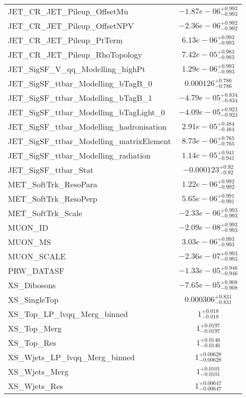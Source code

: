 \begin{tabular}{|l|c|}
JET\_CR\_JET\_Pileup\_OffsetMu & $-1.87e-06^{+0.993}_{-0.993}$ \\
JET\_CR\_JET\_Pileup\_OffsetNPV & $-2.36e-06^{+0.992}_{-0.992}$ \\
JET\_CR\_JET\_Pileup\_PtTerm & $6.13e-06^{+0.993}_{-0.993}$ \\
JET\_CR\_JET\_Pileup\_RhoTopology & $7.42e-05^{+0.983}_{-0.983}$ \\
JET\_SigSF\_V\_qq\_Modelling\_highPt & $1.29e-06^{+0.993}_{-0.993}$ \\
JET\_SigSF\_ttbar\_Modelling\_bTagB\_0 & $0.000126^{+0.786}_{-0.786}$ \\
JET\_SigSF\_ttbar\_Modelling\_bTagB\_1 & $-4.79e-05^{+0.834}_{-0.834}$ \\
JET\_SigSF\_ttbar\_Modelling\_bTagLight\_0 & $-4.09e-05^{+0.923}_{-0.923}$ \\
JET\_SigSF\_ttbar\_Modelling\_hadronisation & $2.91e-05^{+0.484}_{-0.484}$ \\
JET\_SigSF\_ttbar\_Modelling\_matrixElement & $8.73e-06^{+0.765}_{-0.765}$ \\
JET\_SigSF\_ttbar\_Modelling\_radiation & $1.14e-05^{+0.941}_{-0.941}$ \\
JET\_SigSF\_ttbar\_Stat & $-0.000123^{+0.92}_{-0.92}$ \\
MET\_SoftTrk\_ResoPara & $1.22e-06^{+0.992}_{-0.992}$ \\
MET\_SoftTrk\_ResoPerp & $5.65e-06^{+0.991}_{-0.991}$ \\
MET\_SoftTrk\_Scale & $-2.33e-06^{+0.993}_{-0.993}$ \\
MUON\_ID & $-2.09e-08^{+0.993}_{-0.993}$ \\
MUON\_MS & $3.03e-06^{+0.993}_{-0.993}$ \\
MUON\_SCALE & $-2.36e-07^{+0.993}_{-0.993}$ \\
PRW\_DATASF & $-1.33e-05^{+0.946}_{-0.946}$ \\
XS\_Dibosons & $-7.65e-05^{+0.908}_{-0.908}$ \\
XS\_SingleTop & $0.000306^{+0.831}_{-0.831}$ \\
XS\_Top\_LP\_lvqq\_Merg\_binned & $1^{+0.018}_{-0.018}$ \\
XS\_Top\_Merg & $1^{+0.0197}_{-0.0197}$ \\
XS\_Top\_Res & $1^{+0.0146}_{-0.0146}$ \\
XS\_Wjets\_LP\_lvqq\_Merg\_binned & $1^{+0.00628}_{-0.00628}$ \\
XS\_Wjets\_Merg & $1^{+0.0101}_{-0.0101}$ \\
XS\_Wjets\_Res & $1^{+0.00647}_{-0.00647}$ \\

\end{tabular}
